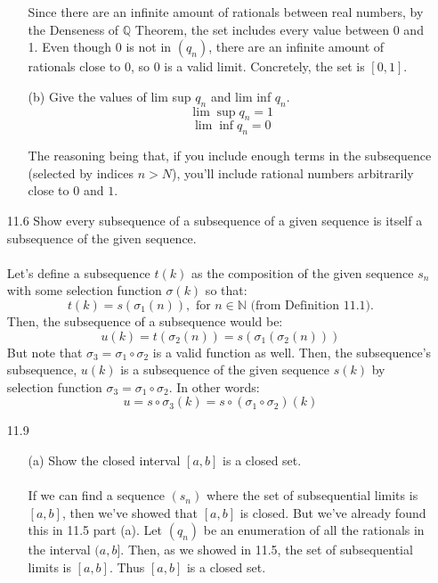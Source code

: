 \begin{itemize}
\begin{itemize}
        Since there are an infinite amount of rationals between real numbers, by the Denseness of $\mathds{Q}$ Theorem, the set includes every value between 0 and 1. Even though $0$ is not in $(q_n)$, there are an infinite amount of rationals close to $0$, so $0$ is a valid limit. Concretely, the set is $[0,1]$.\\

      \item [(b)] Give the values of lim sup $q_n$ and lim inf $q_n$.
        $$\lim_{} \sup q_n = 1$$
        $$\lim_{} \inf q_n = 0$$

        The reasoning being that, if you include enough terms in the subsequence (selected by indices $n > N$), you'll include rational numbers arbitrarily close to $0$ and $1$.\\

    \end{itemize}
  \item [11.6]
    Show every subsequence of a subsequence of a given sequence is itself a subsequence of the given sequence.\\\\

    Let's define a subsequence $t(k)$ as the composition of the given sequence $s_n$ with some selection function $\sigma(k)$ so that:
    $$t(k) = s(\sigma_1(n)), \text{ for $n \in \mathds{N}$ (from Definition 11.1).}$$ 
    Then, the subsequence of a subsequence would be:
    $$u(k) = t(\sigma_2(n)) = s(\sigma_1(\sigma_2(n)))$$
    But note that $\sigma_3 = \sigma_1 \circ \sigma_2$ is a valid function as well. Then, the subsequence's subsequence, $u(k)$ is a subsequence of the given sequence $s(k)$ by selection function $\sigma_3 = \sigma_1 \circ \sigma_2$. In other words:
    $$u = s \circ \sigma_3 (k) = s \circ (\sigma_1 \circ \sigma_2) (k)$$
  \item [11.9]
    \begin{itemize}
      \item [(a)] Show the closed interval $[a, b]$ is a closed set.\\\\

        If we can find a sequence $(s_n)$ where the set of subsequential limits is $[a,b]$, then we've showed that $[a,b]$ is closed. But we've already found this in 11.5 part (a). Let $(q_n)$ be an enumeration of all the rationals in the interval $(a,b]$. Then, as we showed in 11.5, the set of subsequential limits is $[a,b]$. Thus $[a,b]$ is a closed set.\\


\end{itemize}
\end{itemize}
